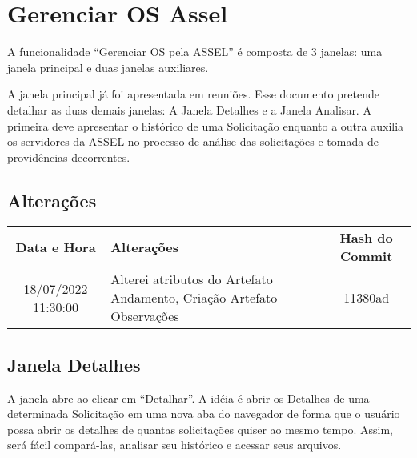 
\chapter{Gerenciar OS Assel}
\label{detalhes:ger-os-assel}


A funcionalidade ``Gerenciar OS pela ASSEL'' é composta de 3 janelas: uma janela principal e duas janelas auxiliares. 

A janela principal já foi apresentada em reuniões. Esse documento pretende detalhar as duas demais janelas: A Janela Detalhes e a Janela Analisar. A primeira deve apresentar o histórico de uma Solicitação enquanto a outra auxilia os servidores da ASSEL no processo de análise das solicitações e tomada de providências decorrentes.

\section*{Alterações}


\begin{center}
	\begin{tabular}{|c|p{}|c|}
		\hline
		\rowcolor{lightgray!50} \multicolumn{3}{|c|}{\Large Alterações \normalsize} \\ \hline \hline
		\rowcolor{lightgray}\textbf{Data e Hora} & \textbf{Alterações} & \textbf{Hash do Commit}  \\ \hline
		\rowcolor{corCOULD!10} 18/07/2022 11:30:00 & Alterei atributos do Artefato Andamento, Criação Artefato Observações & 11380ad \\ \hline			
	\end{tabular}    
\end{center}




\section{Janela Detalhes}

	A janela abre ao clicar em ``Detalhar''. A idéia é abrir os Detalhes de uma determinada Solicitação em uma nova aba do navegador de forma que o usuário possa abrir os detalhes de quantas solicitações quiser ao mesmo tempo. Assim, será fácil compará-las, analisar seu histórico e acessar seus arquivos.

